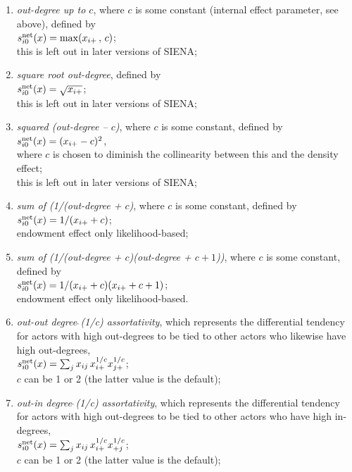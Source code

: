 \documentclass[a4paper,fleqn]{article}
\newcommand{\+}{\, + \,}
\newcommand{\vit}{\theenumi}
\newcommand{\si}{{\sf SIENA}}
\begin{document}
{\begin{enumerate}
 \item {\em out-degree up to $c$}, where $c$ is some constant
 (internal effect parameter, see above),
 defined by  \\
 $s^{\rm net}_{i\vit}(x) = \max(x_{i+}\,,\, c)$;\\
 this is left out in later versions of \si;

 \item {\em square root out-degree}, defined by  \\
 $s^{\rm net}_{i\vit}(x) = \sqrt{x_{i+}}$;\\
 this is left out in later versions of \si;

 \item {\em squared (out-degree -- $c$)}, where $c$ is some constant,
 defined by  \\
 $s^{\rm net}_{i\vit}(x) = (x_{i+} - c)^2$,\\
 where $c$ is chosen to diminish the collinearity between this
 and the density effect;\\
 this is left out in later versions of \si;

 \item {\em sum of (1/(out-degree + $c$)}, where $c$ is some constant,
 defined by  \\
 $s^{\rm net}_{i\vit}(x) = 1/(x_{i+} + c)$;\\
 endowment effect only likelihood-based;

 \item {\em sum of (1/(out-degree + $c$)(out-degree + $c+1$))}, where $c$ is some constant,
 defined by  \\
 $s^{\rm net}_{i\vit}(x) = 1/(x_{i+} + c)(x_{i+} + c + 1)$;\\
 endowment effect only likelihood-based.

 \item {\em out-out degree$\,\hat{\ }$(1/c) assortativity},
 which represents the differential tendency for actors with high out-degrees
 to be tied to other actors who likewise have high out-degrees,\\
 $s^{\rm net}_{i\vit}(x) = \sum_j x_{ij}\, {x_{i+}^{1/c}} {x_{j+}^{1/c}} $;\\
 $c$ can be 1 or 2 (the latter value is the default);

 \item {\em out-in degree$\,\hat{\ }$(1/c) assortativity},
 which represents the differential tendency for actors with high out-degrees
 to be tied to other actors who have high in-degrees,\\
 $s^{\rm net}_{i\vit}(x) = \sum_j x_{ij}\, {x_{i+}^{1/c}} {x_{+j}^{1/c}} $;\\
 $c$ can be 1 or 2 (the latter value is the default);


\end{enumerate}}
\end{document}

